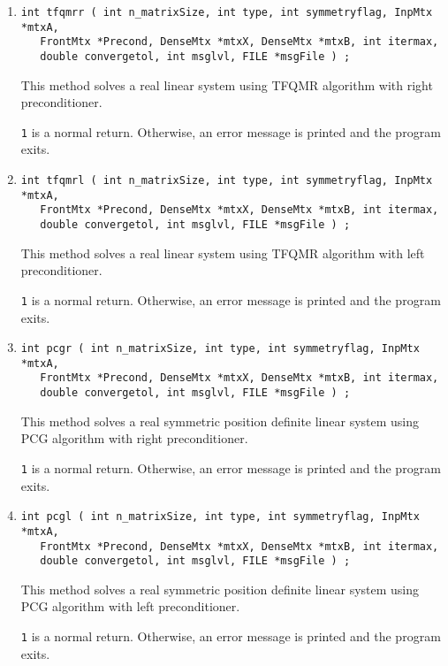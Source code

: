 \begin{enumerate}
\item
\begin{verbatim}
int tfqmrr ( int n_matrixSize, int type, int symmetryflag, InpMtx *mtxA,
   FrontMtx *Precond, DenseMtx *mtxX, DenseMtx *mtxB, int itermax,
   double convergetol, int msglvl, FILE *msgFile ) ;
\end{verbatim}
\par
This method solves a real linear system using TFQMR algorithm with right 
preconditioner. 
\par {}
{\tt 1} is a normal return.  Otherwise, an error message is printed and 
the program exits.

\item
\begin{verbatim}
int tfqmrl ( int n_matrixSize, int type, int symmetryflag, InpMtx *mtxA,
   FrontMtx *Precond, DenseMtx *mtxX, DenseMtx *mtxB, int itermax,
   double convergetol, int msglvl, FILE *msgFile ) ;
\end{verbatim}
\par
This method solves a real linear system using TFQMR algorithm with left
preconditioner. 
\par {}
{\tt 1} is a normal return.  Otherwise, an error message is printed and 
the program exits.

\item
\begin{verbatim}
int pcgr ( int n_matrixSize, int type, int symmetryflag, InpMtx *mtxA,
   FrontMtx *Precond, DenseMtx *mtxX, DenseMtx *mtxB, int itermax,
   double convergetol, int msglvl, FILE *msgFile ) ;
\end{verbatim}
\par
This method solves a real symmetric position definite linear 
system using PCG algorithm with right preconditioner. 
\par {}
{\tt 1} is a normal return.  Otherwise, an error message is printed and 
the program exits.

\item
\begin{verbatim}
int pcgl ( int n_matrixSize, int type, int symmetryflag, InpMtx *mtxA,
   FrontMtx *Precond, DenseMtx *mtxX, DenseMtx *mtxB, int itermax,
   double convergetol, int msglvl, FILE *msgFile ) ;
\end{verbatim}
\par
This method solves a real symmetric position definite linear system 
using PCG algorithm with left preconditioner. 
\par {}
{\tt 1} is a normal return.  Otherwise, an error message is printed and 
the program exits.


\end{enumerate}
